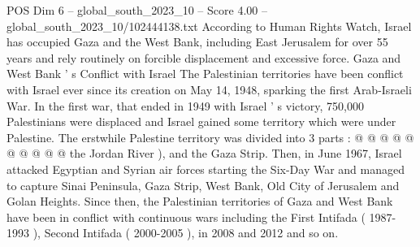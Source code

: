 \begin{textsample}{POS Dim 6 – global\_south\_2023\_10 – Score 4.00 – global\_south\_2023\_10/102444138.txt}
According to Human Rights Watch, Israel has occupied Gaza and the West Bank, including East Jerusalem for over 55 years and rely routinely on forcible displacement and excessive force.
Gaza and West Bank ' s Conflict with Israel The Palestinian territories have been conflict with Israel ever since its creation on May 14, 1948, sparking the first Arab-Israeli War.
In the first war, that ended in 1949 with Israel ' s victory, 750,000 Palestinians were displaced and Israel gained some territory which were under Palestine.
The erstwhile Palestine territory was divided into 3 parts : @ @ @ @ @ @ @ @ @ @ the Jordan River ), and the Gaza Strip.
Then, in June 1967, Israel attacked Egyptian and Syrian air forces starting the Six-Day War and managed to capture Sinai Peninsula, Gaza Strip, West Bank, Old City of Jerusalem and Golan Heights.
Since then, the Palestinian territories of Gaza and West Bank have been in conflict with continuous wars including the First Intifada ( 1987-1993 ), Second Intifada ( 2000-2005 ), in 2008 and 2012 and so on.

\end{textsample}
